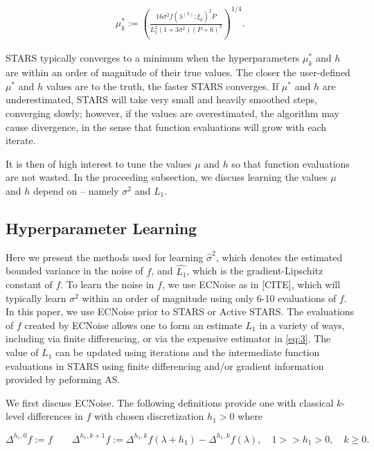 \documentclass{amsart}
\begin{document}
\begin{eqnarray} \label{eq:10}
\mu^*_k:=\left( \frac{16 \sigma^2 f(\lambda^{(k)};\xi_k)^2 P}{L_1^2(1+3\sigma^2)(P+6)^3}\right)^{1/4}.
\end{eqnarray} 

STARS typically converges to a minimum when the hyperparameters $\mu_k^*$ and $h$ are within an order of magnitude of their true values. The closer the user-defined $\mu^*$ and $h$ values are to the truth, the faster STARS converges. If $\mu^*$ and $h$ are underestimated, STARS will take very small and heavily smoothed steps, converging slowly; however, if the values are overestimated, the algorithm may cause divergence, in the sense that function evaluations will grow with each iterate.

It is then of high interest to tune the values $\mu$ and $h$ so that function evaluations are not wasted. In the proceeding subsection, we discuss learning the values $\mu$ and $h$ depend on -- namely $\sigma^2$ and $L_1$.


\subsection{Hyperparameter Learning}

Here we present the methods used for learning $\hat{\sigma}^2$, which denotes the estimated bounded variance in the noise of $f$, and $\hat{L_1}$, which is the gradient-Lipschitz constant of $f$. To learn the noise in $f$, we use ECNoise as in [CITE], which will typically learn $\sigma^2$ within an order of magnitude using only 6-10 evaluations of $f$. In this paper, we use ECNoise prior to STARS or Active STARS. The evaluations of $f$ created by ECNoise allows one to form an estimate $L_1$ in a variety of ways, including via finite differencing, or via the expensive estimator in \eqref{eq:3}. The value of $L_1$ can be updated using iterations and the intermediate function evaluations in STARS using finite differencing and/or gradient information provided by peforming AS.

We first discuss ECNoise. The following definitions provide one with classical $k$-level differences in $f$ with chosen discretization $h_1>0$ where

\begin{equation} \label{eq:11}
\Delta^{h_1,0} f :=f \quad \quad \Delta^{h_1,k+1} f:=\Delta^{h_1,k} f(\lambda+h_1)- \Delta^{h_1,k} f(\lambda), \quad 1>>h_1>0, \quad k \geq 0.
\end{equation}  
\end{document}
